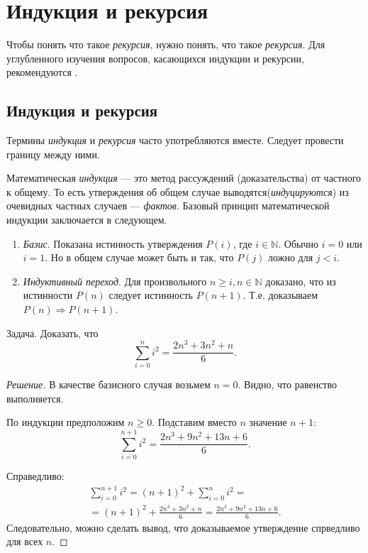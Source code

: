 \chapter{Индукция и рекурсия}

Чтобы понять что такое \emph{рекурсия}, нужно понять, что такое \emph{рекурсия}. Для углубленного изучения вопросов, касающихся индукции и рекурсии, рекомендуются \cite{bib:haggard:discrmathprogrammer,bib:miller:secParAlghorithm,bib:hopkroft:automateIntro}.


\section{Индукция и рекурсия}

Термины \emph{индукция} и \emph{рекурсия} часто употребляются вместе. Следует провести границу между ними.

Математическая \emph{индукция} --- это метод рассуждений (доказательства) от частного к общему. То есть утверждения об общем случае выводятся(\emph{индуцируются}) из очевидных частных случаев --- \emph{фактов}. Базовый принцип математической индукции заключается в следующем.
\begin{enumerate}
    \item \emph{Базис}. Показана истинность утверждения $P(i)$, где $i\in\mathbb{N}$. Обычно $i=0$ или $i=1$. Но в общем случае может быть и так, что $P(j)$ ложно для $j<i$.
    \item \emph{Индуктивный переход}. Для произвольного $n\geq i,n\in\mathbb{N}$ доказано, что из истинности $P(n)$ следует истинность $P(n+1)$. Т.е. доказываем $P(n)\Rightarrow P(n+1)$.
\end{enumerate}

\begin{exampl}
    Задача. Доказать, что 
    \[
        \sum_{i=0}^{n}i^2=\frac{2n^3+3n^2+n}{6}.
    \]
\end{exampl}
\begin{proof}[Решение]
    В качестве базисного случая возьмем $n=0$. Видно, что равенство выполняется.
    
    По индукции предположим $n\geq 0$. Подставим вместо $n$ значение $n+1$:
    \[
        \sum_{i=0}^{n+1}i^2=\frac{2n^3+9n^2+13n+6}{6}.
    \]
    
    Справедливо:
    \[
        \begin{split}
            \sum_{i=0}^{n+1}i^2=(n+1)^2+\sum_{i=0}^{n}i^2=\\
            =(n+1)^2+\frac{2n^3+3n^2+n}{6}=\frac{2n^3+9n^2+13n+6}{6}.
        \end{split}
    \]
    Следовательно, можно сделать вывод, что доказываемое утверждение спрведливо для всех $n$.
\end{proof}

